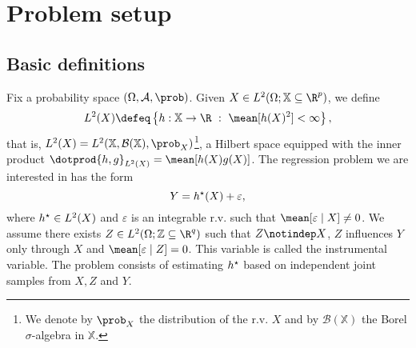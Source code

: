 \section{Problem setup}

\subsection{Basic definitions}

Fix a probability space $ ( \Omega, \mathcal{A}, \prob ) $.
Given $ X \in L^{ 2 } ( \Omega ; \mathbb{X} \subseteq \R^{ p } ) $, we define
\begin{equation*}
    L^{ 2 } ( X ) \defeq \left\{ h : \mathbb{X} \to \R \ : \ \mean [ h ( X )^2 ] < \infty \right\}
,\end{equation*}
that is, $ L^{ 2 } ( X ) = L^{ 2 } ( \mathbb{X}, \mathcal{B} ( \mathbb{X} ), \prob_{ X } ) $\footnote{We denote by $ \prob_{ X } $ the distribution of the r.v. $ X $ and by $ \mathcal{B} ( \mathbb{X} ) $ the Borel $ \sigma $-algebra in $ \mathbb{X} $.}, a Hilbert space equipped with the inner product $ \dotprod{ h, g }_{ L^{ 2 } ( X ) } = \mean [ h ( X ) g ( X ) ] $.
The regression problem we are interested in has the form
\begin{equation}
    \label{eq: main problem}
    Y = h^{ \star } (X) + \varepsilon
,\end{equation}
where $ h^{ \star } \in L^{ 2 } ( X ) $ and $ \varepsilon $ is an integrable r.v. such that $ \mean [ \varepsilon \mid X ] \neq 0 $.
We assume there exists $ Z \in L^{ 2 } ( \Omega ; \mathbb{Z} \subseteq \R^{ q } ) $ such that $ Z \notindep X $, $ Z $ influences $ Y $ only through $ X $ and $ \mean [ \varepsilon \mid Z ] = 0 $.
This variable is called the instrumental variable.
The problem consists of estimating $ h^{ \star } $ based on independent joint samples from $ X, Z $ and $ Y $.

